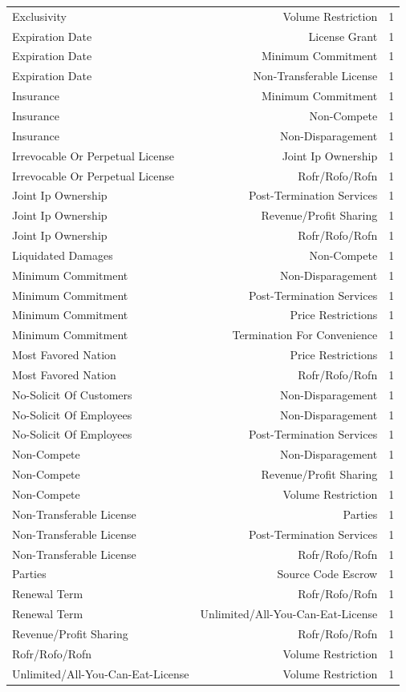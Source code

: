 \begin{tabular}{lrr}
Exclusivity & Volume Restriction & 1 \\
Expiration Date & License Grant & 1 \\
Expiration Date & Minimum Commitment & 1 \\
Expiration Date & Non-Transferable License & 1 \\
Insurance & Minimum Commitment & 1 \\
Insurance & Non-Compete & 1 \\
Insurance & Non-Disparagement & 1 \\
Irrevocable Or Perpetual License & Joint Ip Ownership & 1 \\
Irrevocable Or Perpetual License & Rofr/Rofo/Rofn & 1 \\
Joint Ip Ownership & Post-Termination Services & 1 \\
Joint Ip Ownership & Revenue/Profit Sharing & 1 \\
Joint Ip Ownership & Rofr/Rofo/Rofn & 1 \\
Liquidated Damages & Non-Compete & 1 \\
Minimum Commitment & Non-Disparagement & 1 \\
Minimum Commitment & Post-Termination Services & 1 \\
Minimum Commitment & Price Restrictions & 1 \\
Minimum Commitment & Termination For Convenience & 1 \\
Most Favored Nation & Price Restrictions & 1 \\
Most Favored Nation & Rofr/Rofo/Rofn & 1 \\
No-Solicit Of Customers & Non-Disparagement & 1 \\
No-Solicit Of Employees & Non-Disparagement & 1 \\
No-Solicit Of Employees & Post-Termination Services & 1 \\
Non-Compete & Non-Disparagement & 1 \\
Non-Compete & Revenue/Profit Sharing & 1 \\
Non-Compete & Volume Restriction & 1 \\
Non-Transferable License & Parties & 1 \\
Non-Transferable License & Post-Termination Services & 1 \\
Non-Transferable License & Rofr/Rofo/Rofn & 1 \\
Parties & Source Code Escrow & 1 \\
Renewal Term & Rofr/Rofo/Rofn & 1 \\
Renewal Term & Unlimited/All-You-Can-Eat-License & 1 \\
Revenue/Profit Sharing & Rofr/Rofo/Rofn & 1 \\
Rofr/Rofo/Rofn & Volume Restriction & 1 \\
Unlimited/All-You-Can-Eat-License & Volume Restriction & 1 \\
\bottomrule
\end{tabular}
